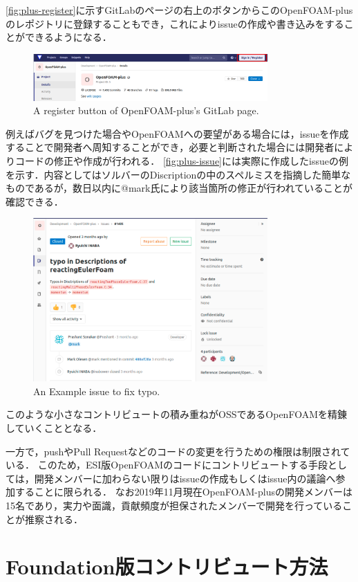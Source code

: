 \documentclass{ltjoc}
\begin{document}
\autoref{fig:plus-register}に示すGitLabのページの右上のボタンからこのOpenFOAM-plusのレポジトリに登録することもでき，これによりissueの作成や書き込みをすることができるようになる．
\begin{figure}[htbp]
\centering
\includegraphics[width=0.8\textwidth]{fig/plus_register.png}
\caption{A register button of OpenFOAM-plus's GitLab page.}
\label{fig:plus-register}
\end{figure}
例えばバグを見つけた場合やOpenFOAMへの要望がある場合には，issueを作成することで開発者へ周知することができ，必要と判断された場合には開発者によりコードの修正や作成が行われる．
\autoref{fig:plus-issue}には実際に作成したissueの例を示す．内容としてはソルバーのDiscriptionの中のスペルミスを指摘した簡単なものであるが，数日以内に@mark氏により該当箇所の修正が行われていることが確認できる．
\begin{figure}[htbp]
\centering
\includegraphics[width=0.8\textwidth]{fig/plus_issue.png}
\caption{An Example issue to fix typo.}
\label{fig:plus-issue}
\end{figure}
このような小さなコントリビュートの積み重ねがOSSであるOpenFOAMを精錬していくこととなる．

一方で，pushやPull Requestなどのコードの変更を行うための権限は制限されている．
このため，ESI版OpenFOAMのコードにコントリビュートする手段としては，開発メンバーに加わらない限りはissueの作成もしくはissue内の議論へ参加することに限られる．
なお2019年11月現在OpenFOAM-plusの開発メンバーは15名であり，実力や面識，貢献頻度が担保されたメンバーで開発を行っていることが推察される．\cite{URL:GitLab-plus-members}
%
\section{Foundation版コントリビュート方法}
\end{document}
